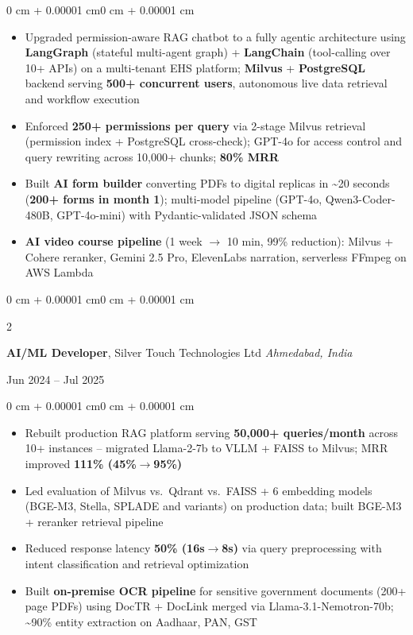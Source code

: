 \documentclass[10pt, letterpaper]{article}
\newenvironment{highlights}{
    \begin{itemize}[
        topsep=0.10 cm,
        parsep=0.10 cm,
        partopsep=0pt,
        itemsep=0pt,
        leftmargin=0 cm + 10pt
    ]
}{
    \end{itemize}
}
\newenvironment{onecolentry}{
    \begin{adjustwidth}{0 cm + 0.00001 cm}{0 cm + 0.00001 cm}
}{
    \end{adjustwidth}
}
\newenvironment{twocolentry}[2][]{
    \onecolentry
    \def\secondColumn{#2}
    \setcolumnwidth{\fill, 5.5 cm}
    \begin{paracol}{2}
}{
    \switchcolumn \raggedleft \secondColumn
    \end{paracol}
    \endonecolentry
}
\begin{document}
        \vspace{0.10 cm}
        \begin{onecolentry}
            \begin{highlights}
                \item Upgraded permission-aware RAG chatbot to a fully agentic architecture using \textbf{LangGraph} (stateful multi-agent graph) + \textbf{LangChain} (tool-calling over 10+ APIs) on a multi-tenant EHS platform; \textbf{Milvus} + \textbf{PostgreSQL} backend serving \textbf{500+ concurrent users}, autonomous live data retrieval and workflow execution
                \item Enforced \textbf{250+ permissions per query} via 2-stage Milvus retrieval (permission index + PostgreSQL cross-check); GPT-4o for access control and query rewriting across 10,000+ chunks; \textbf{80\% MRR}
                \item Built \textbf{AI form builder} converting PDFs to digital replicas in \textasciitilde20 seconds (\textbf{200+ forms in month 1}); multi-model pipeline (GPT-4o, Qwen3-Coder-480B, GPT-4o-mini) with Pydantic-validated JSON schema
                \item \textbf{AI video course pipeline} (1 week $\rightarrow$ 10 min, 99\% reduction): Milvus + Cohere reranker, Gemini 2.5 Pro, ElevenLabs narration, serverless FFmpeg on AWS Lambda
            \end{highlights}
        \end{onecolentry}

        \vspace{0.15 cm}

        \begin{twocolentry}{
            Jun 2024 -- Jul 2025
        }
            \textbf{AI/ML Developer}, Silver Touch Technologies Ltd \hfill \textit{Ahmedabad, India}
        \end{twocolentry}

        \vspace{0.10 cm}
        \begin{onecolentry}
            \begin{highlights}
                \item Rebuilt production RAG platform serving \textbf{50,000+ queries/month} across 10+ instances -- migrated Llama-2-7b to VLLM + FAISS to Milvus; MRR improved \textbf{111\% (45\%$\rightarrow$95\%)}
                \item Led evaluation of Milvus vs.\ Qdrant vs.\ FAISS + 6 embedding models (BGE-M3, Stella, SPLADE and variants) on production data; built BGE-M3 + reranker retrieval pipeline
                \item Reduced response latency \textbf{50\% (16s$\rightarrow$8s)} via query preprocessing with intent classification and retrieval optimization
                \item Built \textbf{on-premise OCR pipeline} for sensitive government documents (200+ page PDFs) using DocTR + DocLink merged via Llama-3.1-Nemotron-70b; \textasciitilde90\% entity extraction on Aadhaar, PAN, GST
            \end{highlights}
        \end{onecolentry}
\end{document}
